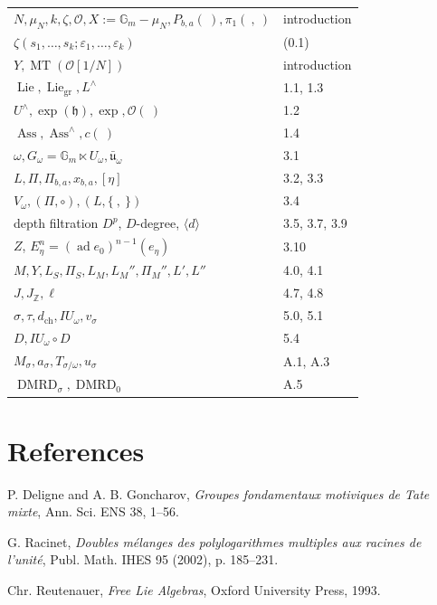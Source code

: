 \documentclass[10pt,a4paper]{article}
\newcommand{\Gm}{\mathbb G_m}
\newcommand{\Z}{\mathbb Z}
\newcommand{\Lie}{\operatorname{Lie}}
\newcommand{\Ass}{\operatorname{Ass}}
\newcommand{\MT}{\operatorname{MT}}
\newcommand{\ad}{\operatorname{ad}}
\newcommand{\OO}{\mathcal O}
\newcommand{\DMRD}{\operatorname{DMRD}}
\theoremstyle{deligne}
\begin{document}
\begin{tabular}{ll}
\(N,\mu_N,k,\zeta,\OO,X:=\Gm-\mu_N,P_{b,a}(\ ),\pi_1(\ ,\ )\) & introduction\\
\(\zeta(s_1,\ldots,s_k;\varepsilon_1,\ldots,\varepsilon_k)\) & (0.1)\\
\(Y,\MT(\OO[1/N])\) & introduction\\
\(\Lie,\Lie_{\mathrm{gr}},L^\wedge\) & 1.1, 1.3\\
\(U^\wedge,\exp(\mathfrak h),\exp,\OO(\ )\) & 1.2\\
\(\Ass,\Ass^\wedge,c(\ )\) & 1.4\\
\(\omega,G_\omega=\Gm\ltimes U_\omega,\bar{\mathfrak u}_\omega\) & 3.1\\
\(L,\Pi,\Pi_{b,a},x_{b,a},[\eta]\) & 3.2, 3.3\\
\(V_\omega,(\Pi,\circ),(L,\{\ ,\ \})\) & 3.4\\
depth filtration \(D^p\), \(D\)-degree, \(\langle d\rangle\) & 3.5, 3.7, 3.9\\
\(Z\), \(E_\eta^n=(\ad e_0)^{n-1}(e_\eta)\) & 3.10\\
\(M,Y,L_S,\Pi_S,L_M,L_M'',\Pi_M'',L',L''\) & 4.0, 4.1\\
\(J,J_\Z,\ell\) & 4.7, 4.8\\
\(\sigma,\tau,d_{\mathrm{ch}},IU_\omega,v_\sigma\) & 5.0, 5.1\\
\(D,IU_\omega\circ D\) & 5.4\\
\(M_\sigma,a_\sigma,T_{\sigma/\omega},u_\sigma\) & A.1, A.3\\
\(\DMRD_\sigma,\DMRD_0\) & A.5
\end{tabular}

\section*{References}

\begin{enumerate}[label={[\arabic*]}]
\item P. Deligne and A. B. Goncharov, \emph{Groupes fondamentaux motiviques de Tate mixte}, Ann. Sci. ENS 38, 1--56.
\item G. Racinet, \emph{Doubles mélanges des polylogarithmes multiples aux racines de l'unité}, Publ. Math. IHES 95 (2002), p. 185--231.
\item Chr. Reutenauer, \emph{Free Lie Algebras}, Oxford University Press, 1993.
\end{enumerate}
\end{document}
